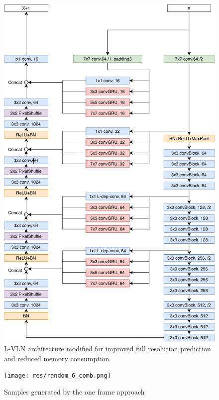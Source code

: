 \documentclass[runningheads,a4paper]{llncs}
\begin{document}
\begin{figure}[htb]
\includegraphics[scale=0.75]{res/experiment.pdf}
\caption{ L-VLN architecture modified for improved full resolution prediction and reduced memory consumption }
\label{fig:modified_arch}
\end{figure}


\begin{figure}[htb]
\texttt{[image: res/random\_6\_comb.png]}
\caption{ Samples generated by the one frame approach }
\label{fig:random_6_comb}
\end{figure}
\end{document}
